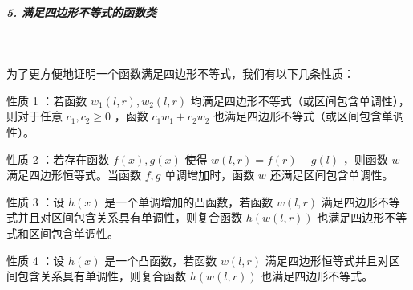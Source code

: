 \subparagraph{5. 满足四边形不等式的函数类}~{}
\par

为了更方便地证明一个函数满足四边形不等式，我们有以下几条性质：

性质 1 ：若函数 $w_1(l,r),w_2(l,r)$ 均满足四边形不等式（或区间包含单调性），则对于任意 $c_1,c_2\geq 0$ ，函数 $c_1w_1+c_2w_2$ 也满足四边形不等式（或区间包含单调性）。

性质 2 ：若存在函数 $f(x),g(x)$ 使得 $w(l,r) = f(r)-g(l)$ ，则函数 $w$ 满足四边形恒等式。当函数 $f,g$ 单调增加时，函数 $w$ 还满足区间包含单调性。

性质 3 ：设 $h(x)$ 是一个单调增加的凸函数，若函数 $w(l,r)$ 满足四边形不等式并且对区间包含关系具有单调性，则复合函数 $h(w(l,r))$ 也满足四边形不等式和区间包含单调性。

性质 4 ：设 $h(x)$ 是一个凸函数，若函数 $w(l,r)$ 满足四边形恒等式并且对区间包含关系具有单调性，则复合函数 $h(w(l,r))$ 也满足四边形不等式。